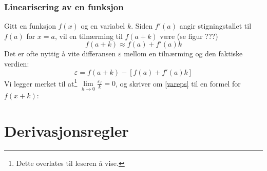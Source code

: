 \subsubsection{Linearisering av en funksjon}
Gitt en funksjon $ f(x) $ og en variabel $ k $. Siden $ f'(a) $ angir stigningstallet til $ f(a) $ for $ x=a $, vil en tilnærming til $ f(a+k) $ være (se figur ???)
\[ f(a+k)\approx f(a)+f'(a)k \]
Det er ofte nyttig å vite differansen $ \varepsilon $ mellom en tilnærming og den faktiske verdien:
\begin{equation}\label{vareps}
	\varepsilon = f(a+k)-\left[f(a)+f'(a)k\right]
\end{equation}
Vi legger merket til at\footnote{Dette overlates til leseren å vise.} $ \lim\limits_{h\to0}\frac{\varepsilon_f}{k} =0 $, og skriver om \eqref{vareps} til en formel for $ f(x+k) $: \regv
{}
\section{Derivasjonsregler}
